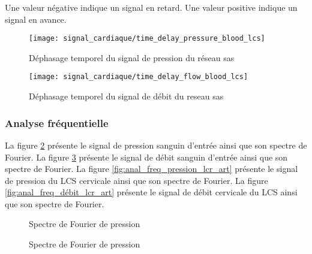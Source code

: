 \documentclass[french]{report}
\begin{document}
Une valeur négative indique un signal en retard. Une valeur positive indique un signal en avance.

\begin{figure}
  \begin{minipage}{0.5\linewidth}
    \centering
    \texttt{[image: signal\_cardiaque/time\_delay\_pressure\_blood\_lcs]}
    \caption{Déphasage temporel du signal de pression du réseau sas}
    \label{fig:deph_pression_sang_lcs_art}
  \end{minipage}
  \hspace{0.5cm}
  \begin{minipage}{0.5\linewidth}
    \centering
    \texttt{[image: signal\_cardiaque/time\_delay\_flow\_blood\_lcs]}
    \caption{Déphasage temporel du signal de débit du reseau sas}
    \label{fig:deph_débit_sang_lcs_art}
  \end{minipage}
  
\end{figure}

\subsubsection{Analyse fréquentielle}

La figure \ref{fig:anal_freq_pression_sang_art} présente le signal de pression sanguin d'entrée ainsi que son spectre de Fourier.
La figure \ref{fig:anal_freq_débit_sang_art} présente le signal de débit sanguin d'entrée ainsi que son spectre de Fourier.
La figure \ref{fig:anal_freq_pression_lcr_art} présente le signal de pression du LCS cervicale ainsi que son spectre de Fourier.
La figure \ref{fig:anal_freq_débit_lcr_art} présente le signal de débit cervicale du LCS ainsi que son spectre de Fourier.


\begin{figure}
    \centering
  \qquad
	\caption{Spectre de Fourier de pression}
  \label{fig:anal_freq_pression_sang_art}
\end{figure}

\begin{figure}
    \centering
  \qquad
	\caption{Spectre de Fourier de pression}
  \label{fig:anal_freq_débit_sang_art}
\end{figure}


\end{document}
